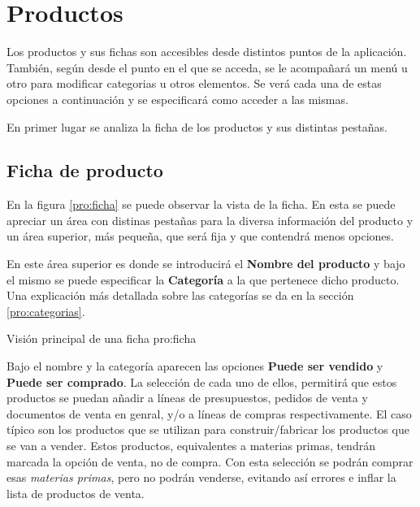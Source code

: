 %
%
%
%

\chapter{Productos}
\label{productos}
Los productos y sus fichas son accesibles desde distintos puntos de la aplicación. También, según desde el punto en el que se acceda, se le acompañará un menú u otro para modificar categorias u otros elementos. Se verá cada una de estas opciones a continuación y se especificará como acceder a las mismas.

En primer lugar se analiza la ficha de los productos y sus distintas pestañas.

\section{Ficha de producto}

En la figura \ref{pro:ficha} se puede observar la vista de la ficha. En esta se puede apreciar un área con distinas pestañas para la diversa información del producto y un área superior, más pequeña, que será fija y que contendrá menos opciones.

En este área superior es donde se introducirá el \textbf{Nombre del producto} y bajo el mismo se puede especificar la \textbf{Categoría} a la que pertenece dicho producto. Una explicación más detallada sobre las categorías se da en la sección \ref{pro:categorias}.

{Visión principal de una ficha}
{pro:ficha}

Bajo el nombre y la categoría aparecen las opciones \textbf{Puede ser vendido} y \textbf{Puede ser comprado}. La selección de cada uno de ellos, permitirá que estos productos se puedan añadir a líneas de presupuestos, pedidos de venta y documentos de venta en genral, y/o a líneas de compras respectivamente. El caso típico son los productos que se utilizan para construir/fabricar los productos que se van a vender. Estos productos, equivalentes a materias primas, tendrán marcada la opción de venta, no de compra. Con esta selección se podrán comprar esas \emph{materias primas}, pero no podrán venderse, evitando así errores e inflar la lista de productos de venta.

